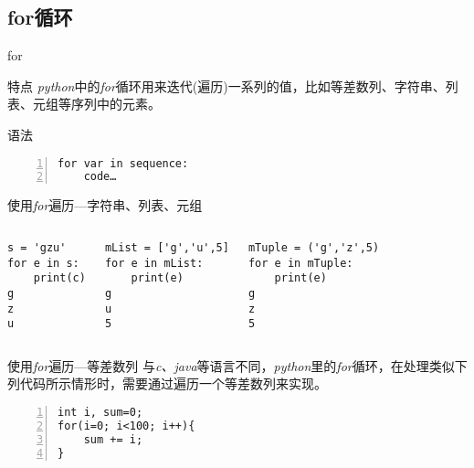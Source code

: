 \documentclass{beamer}
\begin{document}
\subsection{for循环}
\begin{frame}[fragile]{for}
\begin{block}{特点}
\textit{python}中的\textit{for}循环用来迭代(遍历)一系列的值，比如等差数列、字符串、列表、元组等序列中的元素。
\end{block}
\begin{block}{语法}
\begin{Verbatim}[numbers=left,frame=single,rulecolor=\color{red}]
for var in sequence:
    code…
\end{Verbatim}
\end{block}
\end{frame}

\begin{frame}[fragile]{使用\textit{for}遍历—字符串、列表、元组}

\begin{columns}
\begin{Verbatim}[numbers=none,frame=single,rulecolor=\color{red}]
s = 'gzu'
for e in s:
    print(c)
g
z
u  
\end{Verbatim}

\begin{Verbatim}[numbers=none,frame=single,rulecolor=\color{red}]
mList = ['g','u',5]
for e in mList:
    print(e)
g
u
5
\end{Verbatim}
\begin{Verbatim}[numbers=none,frame=single,rulecolor=\color{red}]
mTuple = ('g','z',5)
for e in mTuple:
    print(e)
g
z
5
\end{Verbatim}
\end{columns}
\end{frame}

\begin{frame}[fragile]{使用\textit{for}遍历—等差数列}
与\textit{c、java}等语言不同，\textit{python}里的\textit{for}循环，在处理类似下列代码所示情形时，需要通过遍历一个等差数列来实现。
\begin{Verbatim}[numbers=left,frame=single,rulecolor=\color{red}]
int i, sum=0;
for(i=0; i<100; i++){
    sum += i;
}
\end{Verbatim}
\end{frame}
\end{document}
